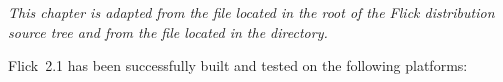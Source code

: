 

\emph{This chapter is adapted from the  file located in the
root of the Flick distribution source tree and from the  file
located in the  directory.}

\hspace{0pt}

\noindent Flick~2.1 has been successfully built and tested on the following
platforms:

